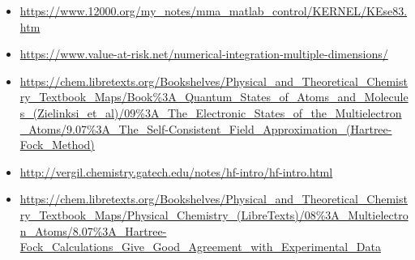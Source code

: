 \documentclass[10pt, oneside, letterpaper]{article}
\begin{document}
\begin{itemize}
  \item \url{https://www.12000.org/my_notes/mma_matlab_control/KERNEL/KEse83.htm} %
  \item \url{https://www.value-at-risk.net/numerical-integration-multiple-dimensions/} %
  \item \url{https://chem.libretexts.org/Bookshelves/Physical_and_Theoretical_Chemistry_Textbook_Maps/Book%3A_Quantum_States_of_Atoms_and_Molecules_(Zielinksi_et_al)/09%3A_The_Electronic_States_of_the_Multielectron_Atoms/9.07%3A_The_Self-Consistent_Field_Approximation_(Hartree-Fock_Method)} %
  \item \url{http://vergil.chemistry.gatech.edu/notes/hf-intro/hf-intro.html} %
  \item \url{https://chem.libretexts.org/Bookshelves/Physical_and_Theoretical_Chemistry_Textbook_Maps/Physical_Chemistry_(LibreTexts)/08%3A_Multielectron_Atoms/8.07%3A_Hartree-Fock_Calculations_Give_Good_Agreement_with_Experimental_Data} %

\end{itemize}
\end{document}
